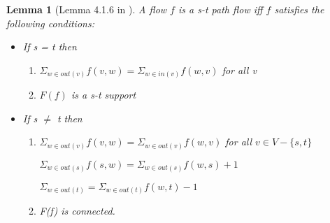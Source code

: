 \documentclass[12pt]{article}
\newtheorem{lemma}{Lemma}
\begin{document}
\begin{lemma}[Lemma 4.1.6 in \cite{DBLP:conf/icalp/ChistikovH17}]  A flow $f$ is a \textit{s-t} path flow iff $f$ satisfies the following conditions:
\begin{itemize}
\item If s = t then
\begin{enumerate}
\item $\Sigma_{w\in out(v)} f(v,w) = \Sigma_{w\in in(v)} f(w,v)$ for all v
\item $F(f)$ is a s-t support


\end{enumerate}


\item If s $\ne$ t then
\begin{enumerate}
\item $\Sigma_{w\in out(v)} f(v,w) = \Sigma_{w\in out(v)} f(w,v)$ for all $v\in V-\{s,t\}$

$\Sigma_{w\in out(s)} f(s,w) = \Sigma_{w\in out(s)} f(w,s) + 1$

$\Sigma_{w\in out(t)} = \Sigma_{w\in out(t)} f(w,t) - 1$


\item F(f) is connected.
\end{enumerate}

\end{itemize}



\end{lemma}
\end{document}

